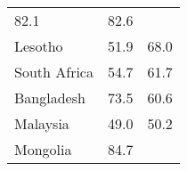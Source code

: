 \documentclass[]{book}
\begin{document}
\begin{longtable}[]{@{}lll@{}}
\begin{minipage}[t]{0.10\columnwidth}
82.1\strut
\end{minipage} & \begin{minipage}[t]{0.29\columnwidth}\raggedright
82.6\strut
\end{minipage}\tabularnewline
\begin{minipage}[t]{0.29\columnwidth}\raggedright
Lesotho\strut
\end{minipage} & \begin{minipage}[t]{0.10\columnwidth}\raggedright
51.9\strut
\end{minipage} & \begin{minipage}[t]{0.29\columnwidth}\raggedright
68.0\strut
\end{minipage}\tabularnewline
\begin{minipage}[t]{0.29\columnwidth}\raggedright
South Africa\strut
\end{minipage} & \begin{minipage}[t]{0.10\columnwidth}\raggedright
54.7\strut
\end{minipage} & \begin{minipage}[t]{0.29\columnwidth}\raggedright
61.7\strut
\end{minipage}\tabularnewline
\begin{minipage}[t]{0.29\columnwidth}\raggedright
Bangladesh\strut
\end{minipage} & \begin{minipage}[t]{0.10\columnwidth}\raggedright
73.5\strut
\end{minipage} & \begin{minipage}[t]{0.29\columnwidth}\raggedright
60.6\strut
\end{minipage}\tabularnewline
\begin{minipage}[t]{0.29\columnwidth}\raggedright
Malaysia\strut
\end{minipage} & \begin{minipage}[t]{0.10\columnwidth}\raggedright
49.0\strut
\end{minipage} & \begin{minipage}[t]{0.29\columnwidth}\raggedright
50.2\strut
\end{minipage}\tabularnewline
\begin{minipage}[t]{0.29\columnwidth}\raggedright
Mongolia\strut
\end{minipage} & \begin{minipage}[t]{0.10\columnwidth}\raggedright
84.7\strut
\end{minipage} & \begin{minipage}[t]{0.29\columnwidth}\raggedright

\end{minipage}
\end{longtable}
\end{document}
